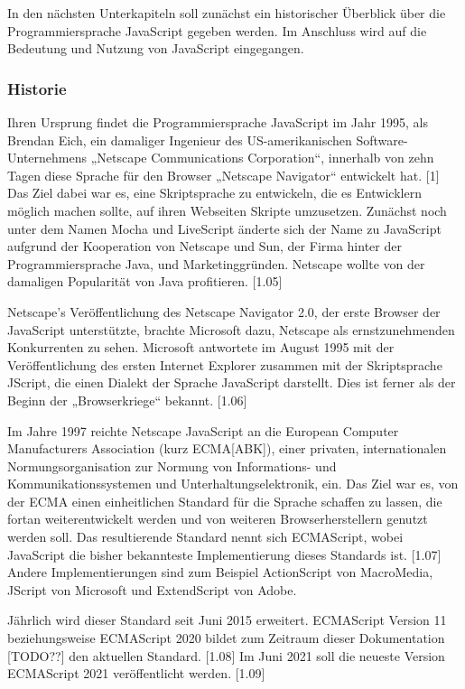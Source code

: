In den nächsten Unterkapiteln soll zunächst ein historischer Überblick über die Programmiersprache JavaScript gegeben werden. Im Anschluss wird auf die Bedeutung und Nutzung von JavaScript eingegangen. 
\newline

\subsubsection{Historie}
Ihren Ursprung findet die Programmiersprache JavaScript im Jahr 1995, als Brendan Eich, ein damaliger Ingenieur des US-amerikanischen Software-Unternehmens „Netscape Communications Corporation“, innerhalb von zehn Tagen diese Sprache für den Browser „Netscape Navigator“ entwickelt hat. [1] Das Ziel dabei war es, eine Skriptsprache zu entwickeln, die es Entwicklern möglich machen sollte, auf ihren Webseiten Skripte umzusetzen. Zunächst noch unter dem Namen Mocha und LiveScript änderte sich der Name zu JavaScript aufgrund der Kooperation von Netscape und Sun, der Firma hinter der Programmiersprache Java, und Marketinggründen. Netscape wollte von der damaligen Popularität von Java profitieren. [1.05] 
\newline

Netscape’s Veröffentlichung des Netscape Navigator 2.0, der erste Browser der JavaScript unterstützte, brachte Microsoft dazu, Netscape als ernstzunehmenden Konkurrenten zu sehen. 
Microsoft antwortete im August 1995 mit der Veröffentlichung des ersten Internet Explorer zusammen mit der Skriptsprache JScript, die einen Dialekt der Sprache JavaScript darstellt. Dies ist ferner als der Beginn der „Browserkriege“ bekannt. [1.06] \newline

Im Jahre 1997 reichte Netscape JavaScript an die European Computer Manufacturers Association (kurz ECMA[ABK]), einer privaten, internationalen Normungsorganisation zur Normung von Informations- und Kommunikationssystemen und Unterhaltungselektronik, ein. Das Ziel war es, von der ECMA einen einheitlichen Standard für die Sprache schaffen zu lassen, die fortan weiterentwickelt werden und von weiteren Browserherstellern genutzt werden soll. Das resultierende Standard nennt sich ECMAScript, wobei JavaScript die bisher bekannteste Implementierung dieses Standards ist. [1.07] Andere Implementierungen sind zum Beispiel ActionScript von Macro\-Media, JScript von Microsoft und ExtendScript von Adobe.
\newline
 
Jährlich wird dieser Standard seit Juni 2015 erweitert. ECMAScript Version 11 beziehungs\-weise ECMAScript 2020 bildet zum Zeitraum dieser Dokumentation [TODO??] den aktuellen Standard. [1.08] 
Im Juni 2021 soll die neueste Version ECMAScript 2021 veröffentlicht werden.  [1.09]
\newline

